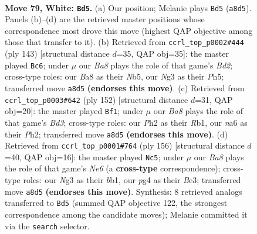 \documentclass[11pt]{article}
\begin{document}
\clearpage

\begin{figure}[p]\centering
\begin{subfigure}{0.46\textwidth}\centering
\resizebox{\linewidth}{!}{%
\newchessgame
\chessboard[
  setfen={B1r5/5p2/n5p1/4P2p/b4Pp1/3k2N1/6KP/8 w - - 16 79},
  showmover=false,
  pgfstyle=straightmove, color=movearrow, markmove={a8-d5}
]}
\caption{}
\end{subfigure}\hfill
\begin{subfigure}{0.46\textwidth}\centering
\resizebox{\linewidth}{!}{%
\newchessgame
\chessboard[
  setfen={8/1R1b4/4k1p1/1n2Pp1p/1P2p2P/1K2P1P1/8/8 b - - 10 72},
  showmover=false,
  pgfstyle=straightmove, color=movearrow, markmove={d7-c6}
]}
\caption{}
\end{subfigure}
\\[4pt]
\begin{subfigure}{0.46\textwidth}\centering
\resizebox{\linewidth}{!}{%
\newchessgame
\chessboard[
  setfen={5k2/1p6/2p5/2Pp2b1/3P2N1/r2B4/2K2p1P/1R6 w - - 10 77},
  showmover=false,
  pgfstyle=straightmove, color=movearrow, markmove={d3-f1}
]}
\caption{}
\end{subfigure}\hfill
\begin{subfigure}{0.46\textwidth}\centering
\resizebox{\linewidth}{!}{%
\newchessgame
\chessboard[
  setfen={7k/3Br1p1/4Np1p/7P/6P1/4B1K1/5P2/1b6 w - - 57 79},
  showmover=false,
  pgfstyle=straightmove, color=movearrow, markmove={e6-c5}
]}
\caption{}
\end{subfigure}
\caption{\textbf{Move 79, White: \texttt{Bd5}.} (a) Our position; Melanie plays \texttt{Bd5} (\texttt{a8d5}). Panels (b)--(d) are the retrieved master positions whose correspondence most drove this move (highest QAP objective among those that transfer to it). (b) Retrieved from \texttt{ccrl\_top\_p0002\#444} (ply 143) [structural distance $d$=35, QAP obj=35]: the master played \texttt{Bc6}; under $\mu$ our \emph{Ba8} plays the role of that game's \emph{Bd2}; cross-type roles: our \emph{B}a8 as their \emph{N}b5, our \emph{N}g3 as their \emph{P}h5; transferred move \texttt{a8d5} \textbf{(endorses this move)}. (c) Retrieved from \texttt{ccrl\_top\_p0003\#642} (ply 152) [structural distance $d$=31, QAP obj=20]: the master played \texttt{Bf1}; under $\mu$ our \emph{Ba8} plays the role of that game's \emph{Bd3}; cross-type roles: our \emph{P}h2 as their \emph{R}b1, our \emph{n}a6 as their \emph{P}h2; transferred move \texttt{a8d5} \textbf{(endorses this move)}. (d) Retrieved from \texttt{ccrl\_top\_p0001\#764} (ply 156) [structural distance $d$=40, QAP obj=16]: the master played \texttt{Nc5}; under $\mu$ our \emph{Ba8} plays the role of that game's \emph{Ne6} (a \textbf{cross-type} correspondence); cross-type roles: our \emph{N}g3 as their \emph{b}b1, our \emph{p}g4 as their \emph{B}e3; transferred move \texttt{a8d5} \textbf{(endorses this move)}. Synthesis: 8 retrieved analogs transferred to \texttt{Bd5} (summed QAP objective 122, the strongest correspondence among the candidate moves); Melanie committed it via the \texttt{search} selector.}
\label{fig:thought-m156}
\end{figure}
\end{document}
